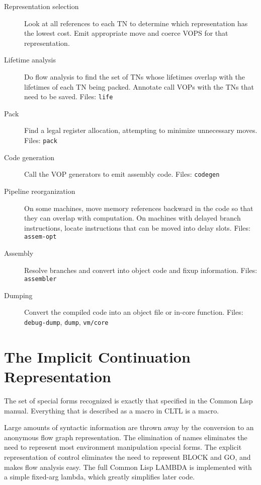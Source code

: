 \begin{description}
\item[Representation selection]
Look at all references to each TN to determine which representation has the
lowest cost.  Emit appropriate move and coerce VOPS for that representation.

\item[Lifetime analysis]
Do flow analysis to find the set of TNs whose lifetimes 
overlap with the lifetimes of each TN being packed.  Annotate call VOPs with
the TNs that need to be saved.  Files: {\tt life}

\item[Pack]
Find a legal register allocation, attempting to minimize unnecessary moves.
Files: {\tt pack}

\item[Code generation]
Call the VOP generators to emit assembly code.  Files: {\tt codegen}

\item[Pipeline reorganization] On some machines, move memory references
backward in the code so that they can overlap with computation.  On machines
with delayed branch instructions, locate instructions that can be moved into
delay slots.  Files: {\tt assem-opt}

\item[Assembly]
Resolve branches and convert into object code and fixup information.
Files: {\tt assembler}

\item[Dumping] Convert the compiled code into an object file or in-core
function.  Files: {\tt debug-dump}, {\tt dump}, {\tt vm/core}

\end{description}

\chapter{The Implicit Continuation Representation}

The set of special forms recognized is exactly that specified in the Common
Lisp manual.  Everything that is described as a macro in CLTL is a macro.

Large amounts of syntactic information are thrown away by the conversion to an
anonymous flow graph representation.  The elimination of names eliminates the
need to represent most environment manipulation special forms.  The explicit
representation of control eliminates the need to represent BLOCK and GO, and
makes flow analysis easy.  The full Common Lisp LAMBDA is implemented with a
simple fixed-arg lambda, which greatly simplifies later code.
      
